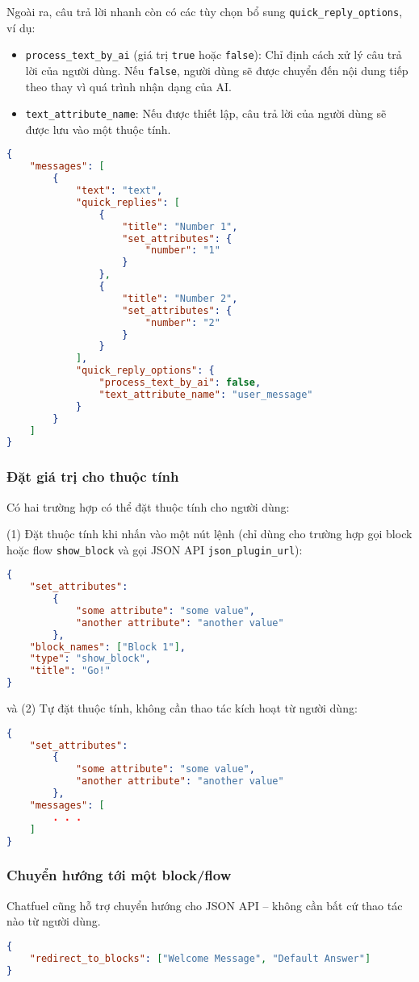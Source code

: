 Ngoài ra, câu trả lời nhanh còn có các tùy chọn bổ sung \texttt{quick\_reply\_options}, ví dụ: \begin{itemize}
\item \texttt{process\_text\_by\_ai} (giá trị \texttt{true} hoặc \texttt{false}): Chỉ định cách xử lý câu trả lời của người dùng. Nếu \texttt{false}, người dùng sẽ được chuyển đến nội dung tiếp theo thay vì quá trình nhận dạng của AI.
\item \texttt{text\_attribute\_name}: Nếu được thiết lập, câu trả lời của người dùng sẽ được lưu vào một thuộc tính.
\end{itemize}\par
\begin{lstlisting}[language=json]
{
	"messages": [
		{
			"text": "text",
			"quick_replies": [
				{
					"title": "Number 1",
					"set_attributes": {
						"number": "1"
					}
				},
				{
					"title": "Number 2",
					"set_attributes": {
						"number": "2"
					}
				}
			],
			"quick_reply_options": {
				"process_text_by_ai": false,
				"text_attribute_name": "user_message"
			}
		}
	]
}
\end{lstlisting}

\subsubsection{Đặt giá trị cho thuộc tính}
Có hai trường hợp có thể đặt thuộc tính cho người dùng:\par
(1) Đặt thuộc tính khi nhấn vào một nút lệnh (chỉ dùng cho trường hợp gọi block hoặc flow \texttt{show\_block} và gọi JSON API \texttt{json\_plugin\_url}): \begin{lstlisting}[language=json]
{
	"set_attributes": 
		{
			"some attribute": "some value",
			"another attribute": "another value"
		},
	"block_names": ["Block 1"],
	"type": "show_block",
	"title": "Go!"
}
\end{lstlisting}
và (2) Tự đặt thuộc tính, không cần thao tác kích hoạt từ người dùng:\begin{lstlisting}[language=json]
{
	"set_attributes":
		{
			"some attribute": "some value",
			"another attribute": "another value"
		},
	"messages": [
		. . .
	]
}
\end{lstlisting}\par

\subsubsection{Chuyển hướng tới một block/flow}
Chatfuel cũng hỗ trợ chuyển hướng cho JSON API – không cần bất cứ thao tác nào từ người dùng.
\begin{lstlisting}[language=json]
{
	"redirect_to_blocks": ["Welcome Message", "Default Answer"]
}
\end{lstlisting}

